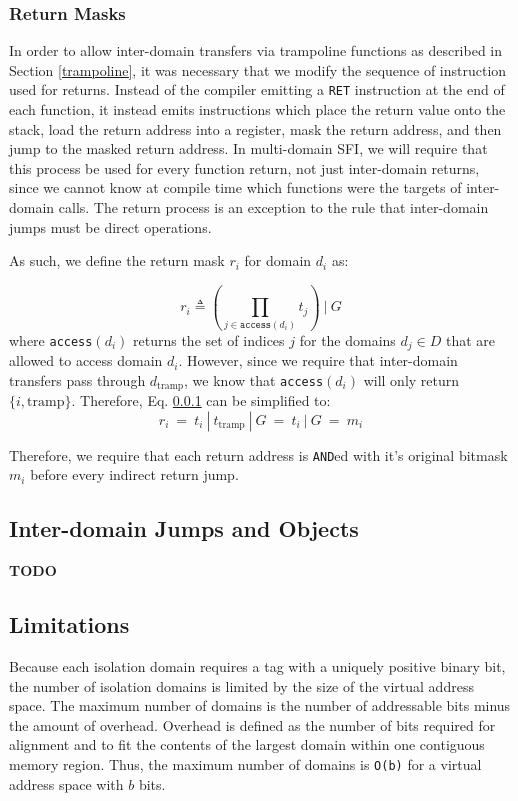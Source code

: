 \documentclass[12pt]{article}
\begin{document}
\subsubsection{Return Masks} \label{retmasks}

In order to allow inter-domain transfers via trampoline functions as described in Section \ref{trampoline}, it was necessary that we modify the sequence of instruction used for returns. Instead of the compiler emitting a \texttt{RET} instruction at the end of each function, it instead emits instructions which place the return value onto the stack, load the return address into a register, mask the return address, and then jump to the masked return address. In multi-domain SFI, we will require that this process be used for every function return, not just inter-domain returns, since we cannot know at compile time which functions were the targets of inter-domain calls. The return process is an exception to the rule that inter-domain jumps must be direct operations.

As such, we define the return mask $r_i$ for domain $d_i$ as:

\begin{equation} \label{eq:retmaskeq}
r_i \triangleq (\prod_{j\in\texttt{access}(d_i)}t_j)\ |\ G
\end{equation}
where \texttt{access}$(d_i)$ returns the set of indices $j$ for the domains $d_j\in D$ that are allowed to access domain $d_i$. However, since we require that inter-domain transfers pass through $d_\text{tramp}$, we know that \texttt{access}$(d_i)$ will only return $\{i,\text{tramp}\}$. Therefore, Eq. \ref{retmasks} can be simplified to:
$$ r_i\ =\ t_i\ |\ t_\text{tramp}\ |\ G\ =\ t_i\ |\ G\ =\ m_i$$

Therefore, we require that each return address is \texttt{AND}ed with it's original bitmask $m_i$ before every indirect return jump.

\subsection{Inter-domain Jumps and Objects}

\textbf{TODO}

\subsection{Limitations}

Because each isolation domain requires a tag with a uniquely positive binary bit, the number of isolation domains is limited by the size of the virtual address space. The maximum number of domains is the number of addressable bits minus the amount of overhead. Overhead is defined as the number of bits required for alignment and to fit the contents of the largest domain within one contiguous memory region. Thus, the maximum number of domains is \texttt{O(b)} for a virtual address space with $b$ bits.
\end{document}

